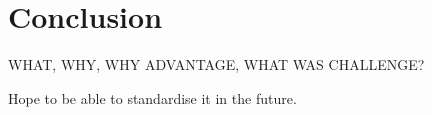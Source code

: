 
\chapter{Conclusion} %

\label{conclusion} %

%


WHAT, WHY, WHY ADVANTAGE, WHAT WAS CHALLENGE?


Hope to be able to standardise it in the future.

